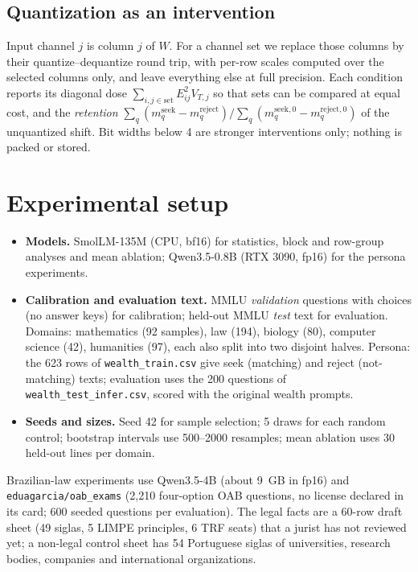 \documentclass[11pt]{article}
\newcommand{\code}[1]{\texttt{#1}}
\begin{document}
\subsection{Quantization as an intervention}
Input channel $j$ is column $j$ of $W$. For a channel set we replace those columns by their quantize--dequantize round trip, with per-row scales
computed over the selected columns only, and leave everything else at full precision. Each condition reports its diagonal dose
$\sum_{i,j\in\text{set}}E_{ij}^2V_{T,j}$ so that sets can be compared at equal cost, and the
\emph{retention} $\sum_q(m^{\text{seek}}_q-m^{\text{reject}}_q)\big/\sum_q(m^{\text{seek},0}_q-m^{\text{reject},0}_q)$ of the unquantized shift.
Bit widths below 4 are stronger interventions only; nothing is packed or stored.

\section{Experimental setup}
\begin{itemize}\setlength\itemsep{0pt}
\item \textbf{Models.} SmolLM-135M (CPU, bf16) for statistics, block and row-group analyses and mean ablation; Qwen3.5-0.8B (RTX 3090, fp16) for the persona experiments.
\item \textbf{Calibration and evaluation text.} MMLU \emph{validation} questions with choices (no answer keys) for calibration; held-out MMLU \emph{test} text for evaluation. Domains:
mathematics (92 samples), law (194), biology (80), computer science (42), humanities (97), each also split into two disjoint halves.
Persona: the 623 rows of \code{wealth\_train.csv} give seek (matching) and reject (not-matching) texts; evaluation uses the 200 questions of \code{wealth\_test\_infer.csv}, scored with the original wealth prompts.
\item \textbf{Seeds and sizes.} Seed 42 for sample selection; 5 draws for each random control; bootstrap intervals use 500--2000 resamples; mean ablation uses 30 held-out lines per domain.
\end{itemize}

Brazilian-law experiments use Qwen3.5-4B (about 9~GB in fp16) and \code{eduagarcia/oab\_exams} (2{,}210 four-option OAB questions, no license declared in its card; 600 seeded questions per evaluation). The legal facts are a 60-row draft sheet
(49 siglas, 5 LIMPE principles, 6 TRF seats) that a jurist has not reviewed yet; a non-legal control sheet has 54 Portuguese siglas of universities, research bodies, companies and international organizations.
\end{document}
